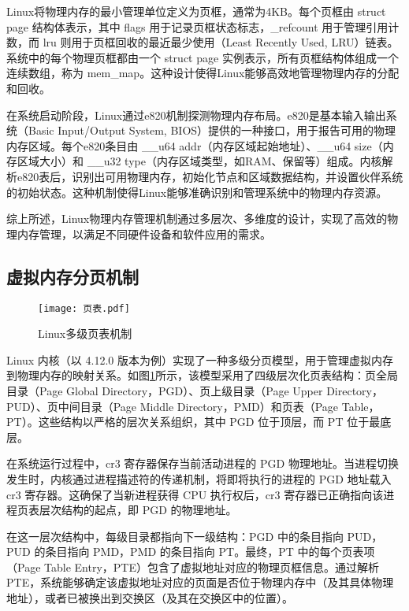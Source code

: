 Linux将物理内存的最小管理单位定义为页框，通常为4KB。每个页框由 struct page 结构体表示，其中 flags 用于记录页框状态标志，\_refcount 用于管理引用计数，而 lru 则用于页框回收的最近最少使用（Least Recently Used, LRU）链表。系统中的每个物理页框都由一个 struct page 实例表示，所有页框结构体组成一个连续数组，称为 mem\_map。这种设计使得Linux能够高效地管理物理内存的分配和回收。

在系统启动阶段，Linux通过e820机制探测物理内存布局。e820是基本输入输出系统（Basic Input/Output System, BIOS）提供的一种接口，用于报告可用的物理内存区域。每个e820条目由 \_\_u64 addr（内存区域起始地址）、\_\_u64 size（内存区域大小）和 \_\_u32 type（内存区域类型，如RAM、保留等）组成。内核解析e820表后，识别出可用物理内存，初始化节点和区域数据结构，并设置伙伴系统的初始状态。这种机制使得Linux能够准确识别和管理系统中的物理内存资源。

综上所述，Linux物理内存管理机制通过多层次、多维度的设计，实现了高效的物理内存管理，以满足不同硬件设备和软件应用的需求。

\subsection{虚拟内存分页机制}

\begin{figure}[htb]
    \centering
    \texttt{[image: 页表.pdf]}
    \caption{Linux多级页表机制}
    \label{页表}
\end{figure}

Linux 内核（以 4.12.0 版本为例）实现了一种多级分页模型，用于管理虚拟内存到物理内存的映射关系。如图\ref{页表}所示，该模型采用了四级层次化页表结构：页全局目录（Page Global Directory，PGD）、页上级目录（Page Upper Directory，PUD）、页中间目录（Page Middle Directory，PMD）和页表（Page Table，PT）。这些结构以严格的层次关系组织，其中 PGD 位于顶层，而 PT 位于最底层。

在系统运行过程中，cr3 寄存器保存当前活动进程的 PGD 物理地址。当进程切换发生时，内核通过进程描述符的传递机制，将即将执行的进程的 PGD 地址载入 cr3 寄存器。这确保了当新进程获得 CPU 执行权后，cr3 寄存器已正确指向该进程页表层次结构的起点，即 PGD 的物理地址。

在这一层次结构中，每级目录都指向下一级结构：PGD 中的条目指向 PUD，PUD 的条目指向 PMD，PMD 的条目指向 PT。最终，PT 中的每个页表项（Page Table Entry，PTE）包含了虚拟地址对应的物理页框信息。通过解析 PTE，系统能够确定该虚拟地址对应的页面是否位于物理内存中（及其具体物理地址），或者已被换出到交换区（及其在交换区中的位置）。

